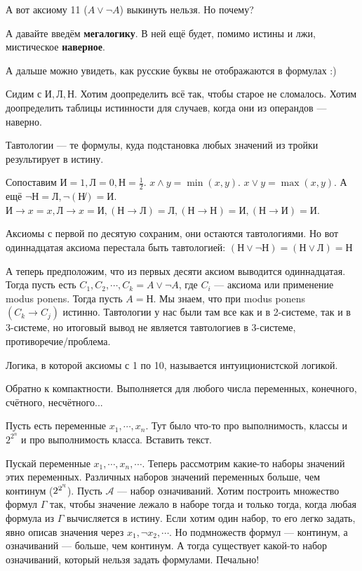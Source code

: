 А вот аксиому 11 ($A \lor \lnot A$) выкинуть нельзя. Но почему?

А давайте введём \textbf{мегалогику}. В ней ещё будет, помимо истины и лжи, мистическое \textbf{наверное}. 

А дальше можно увидеть, как русские буквы не отображаются в формулах :)

Сидим с $И, Л, Н$. Хотим доопределить всё так, чтобы старое не сломалось. Хотим доопределить таблицы истинности для случаев, когда они из операндов --- наверно.

Тавтологии --- те формулы, куда подстановка любых значений из тройки результирует в истину. 

Сопоставим $И = 1, Л = 0, Н = \frac12$. $x \land y = \min(x, y)$. $x \lor y = \max(x, y)$. А ещё $\lnot Н = Л, \lnot(\not Н) = И$. $И \to x = x, Л \to x = И, (Н \to Л) = Л, (Н \to Н) = И, (Н \to И) = И$.

Аксиомы с первой по десятую сохраним, они остаются тавтологиями. Но вот одиннадцатая аксиома перестала быть тавтологией: $(Н \lor \lnot Н) = (Н \lor Л) = Н$

А теперь предположим, что из первых десяти аксиом выводится одиннадцатая. Тогда пусть есть $C_1, C_2, \cdots, C_k = A \lor \lnot A$, где $C_i$ --- аксиома или применение modus ponens. Тогда пусть $A = Н$. Мы знаем, что при modus ponens $(C_k \to C_j)$ истинно. Тавтологии у нас были там все как и в 2-системе, так и в 3-системе, но итоговый вывод не является тавтологиев в 3-системе, противоречие/проблема. 

Логика, в которой аксиомы с 1 по 10, называется интуиционистской логикой.

Обратно к компактности. Выполняется для любого числа переменных, конечного, счётного, несчётного...

Пусть есть переменные $x_1, \cdots, x_n$. Тут было что-то про выполнимость, классы и $2^{2^n}$ и про выполнимость класса. Вставить текст.

Пускай переменные $x_1, \cdots, x_n, \cdots$. Теперь рассмотрим какие-то наборы значений этих переменных.  Различных наборов значений переменных больше, чем континум ($2^{2^{\mathbb{N}}}$). Пусть $\mathcal{A}$ --- набор означиваний. Хотим построить множество формул $\Gamma$ так, чтобы значение лежало в наборе тогда и только тогда, когда любая формула из $\Gamma$ вычисляется в истину. Если хотим один набор, то его легко задать, явно описав значения через $x_1, \lnot x_2, \cdots$. Но подмножеств формул --- континум, а означиваний --- больше, чем континум. А тогда существует какой-то набор означиваний, который нельзя задать формулами. Печально!


